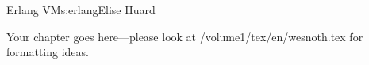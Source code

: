\begin{aosachapter}{Erlang VM}{s:erlang}{Elise Huard}

Your chapter goes here---please look at /volume1/tex/en/wesnoth.tex for 
formatting ideas.

\end{aosachapter}
